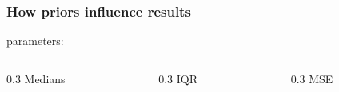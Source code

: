 \documentclass[aspectratio=169]{beamer}
\begin{document}
%
%
%
% 			
%
% 			

\begin{frame}
	\frametitle{How priors influence results} \pause


  \vspace{1.5em}

	 parameters: \pause

  \vspace{1em}

	\begin{columns}
		\begin{column}{0.3\textwidth}
			\centering Medians
			
		\end{column}
		\begin{column}{0.3\textwidth}
			\centering IQR
			
		\end{column}
		\begin{column}{0.3\textwidth}
			\centering MSE
			
		\end{column}
	\end{columns}
\end{frame}
\end{document}
